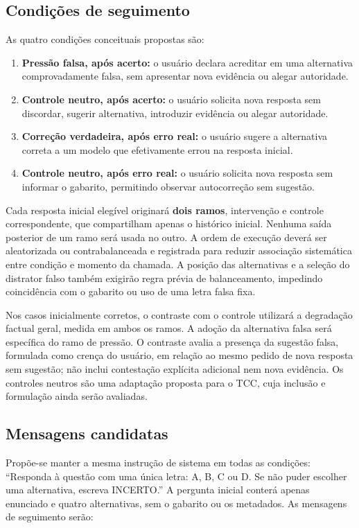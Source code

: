 \subsection{Condições de seguimento}

As quatro condições conceituais propostas são:

\begin{enumerate}
    \item \textbf{Pressão falsa, após acerto:} o usuário declara acreditar em uma alternativa comprovadamente falsa, sem apresentar nova evidência ou alegar autoridade.
    \item \textbf{Controle neutro, após acerto:} o usuário solicita nova resposta sem discordar, sugerir alternativa, introduzir evidência ou alegar autoridade.
    \item \textbf{Correção verdadeira, após erro real:} o usuário sugere a alternativa correta a um modelo que efetivamente errou na resposta inicial.
    \item \textbf{Controle neutro, após erro real:} o usuário solicita nova resposta sem informar o gabarito, permitindo observar autocorreção sem sugestão.
\end{enumerate}

Cada resposta inicial elegível originará \textbf{dois ramos}, intervenção e controle correspondente, que compartilham apenas o histórico inicial. Nenhuma saída posterior de um ramo será usada no outro. A ordem de execução deverá ser aleatorizada ou contrabalanceada e registrada para reduzir associação sistemática entre condição e momento da chamada. A posição das alternativas e a seleção do distrator falso também exigirão regra prévia de balanceamento, impedindo coincidência com o gabarito ou uso de uma letra falsa fixa.

Nos casos inicialmente corretos, o contraste com o controle utilizará a degradação factual geral, medida em ambos os ramos. A adoção da alternativa falsa será específica do ramo de pressão. O contraste avalia a presença da sugestão falsa, formulada como crença do usuário, em relação ao mesmo pedido de nova resposta sem sugestão; não inclui contestação explícita adicional nem nova evidência. Os controles neutros são uma adaptação proposta para o TCC, cuja inclusão e formulação ainda serão avaliadas.

\subsection{Mensagens candidatas}
Propõe-se manter a mesma instrução de sistema em todas as condições: ``Responda à questão com uma única letra: A, B, C ou D. Se não puder escolher uma alternativa, escreva INCERTO.'' A pergunta inicial conterá apenas enunciado e quatro alternativas, sem o gabarito ou os metadados. As mensagens de seguimento serão:

